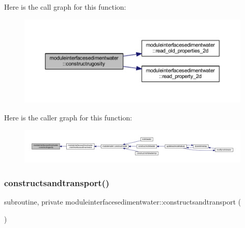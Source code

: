 Here is the call graph for this function\+:\nopagebreak
\begin{figure}[H]
\begin{center}
\leavevmode
\includegraphics[width=350pt]{namespacemoduleinterfacesedimentwater_ae92e82b3ef714cf8b3516fa5e25469d3_cgraph}
\end{center}
\end{figure}
Here is the caller graph for this function\+:\nopagebreak
\begin{figure}[H]
\begin{center}
\leavevmode
\includegraphics[width=350pt]{namespacemoduleinterfacesedimentwater_ae92e82b3ef714cf8b3516fa5e25469d3_icgraph}
\end{center}
\end{figure}
\mbox{\label{namespacemoduleinterfacesedimentwater_a73bbb1dff0427c5f11a6ca3dce2ac6fb}} 
\subsubsection{\texorpdfstring{constructsandtransport()}{constructsandtransport()}}
{\footnotesize\ttfamily subroutine, private moduleinterfacesedimentwater\+::constructsandtransport (\begin{DoxyParamCaption}{ }\end{DoxyParamCaption})\hspace{0.3cm}{\ttfamily [private]}}

